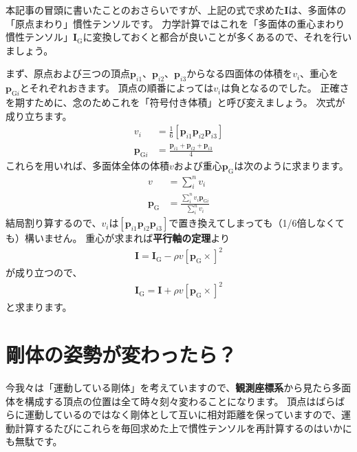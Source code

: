 \documentclass{jsarticle}
\begin{document}
本記事の冒頭に書いたことのおさらいですが、上記の式で求めた$\boldsymbol{I}$は、多面体の「原点まわり」慣性テンソルです。
力学計算ではこれを「多面体の重心まわり慣性テンソル」$\boldsymbol{I}_{\mathrm{G}}$に変換しておくと都合が良いことが多くあるので、それを行いましょう。

まず、原点および三つの頂点$\boldsymbol{p}_{i1}$、$\boldsymbol{p}_{i2}$、$\boldsymbol{p}_{i3}$からなる四面体の体積を$v_{i}$、重心を$\boldsymbol{p}_{\mathrm{G}i}$とそれぞれおきます。
頂点の順番によっては$v_{i}$は負となるのでした。
正確さを期すために、念のためこれを「符号付き体積」と呼び変えましょう。
次式が成り立ちます。
\begin{align*}
v_{i}&=\frac{1}{6}[\boldsymbol{p}_{i1} \boldsymbol{p}_{i2} \boldsymbol{p}_{i3}]
\\
\boldsymbol{p}_{\mathrm{G}i}&=\frac{\displaystyle \boldsymbol{p}_{i1}+\boldsymbol{p}_{i2}+\boldsymbol{p}_{i3}}{4}
\end{align*}
これらを用いれば、多面体全体の体積$v$および重心$\boldsymbol{p}_{\mathrm{G}}$は次のように求まります。
\begin{align*}
v&=\sum_{i}^{n}v_{i}
\\
\boldsymbol{p}_{\mathrm{G}}&=\frac{\displaystyle\sum_{i}^{n}v_{i}\boldsymbol{p}_{\mathrm{G}i}}{\displaystyle\sum_{i}^{n}v_{i}}
\end{align*}
結局割り算するので、$v_{i}$は$[\boldsymbol{p}_{i1} \boldsymbol{p}_{i2} \boldsymbol{p}_{i3}]$で置き換えてしまっても（1/6倍しなくても）構いません。
重心が求まれば{\bf 平行軸の定理}より
\begin{align*}
\boldsymbol{I}=\boldsymbol{I}_{\mathrm{G}}-\rho v\left[\boldsymbol{p}_{\mathrm{G}}\times\right]^{2}
\end{align*}
が成り立つので、
\begin{align*}
\boldsymbol{I}_{\mathrm{G}}=\boldsymbol{I}+\rho v\left[\boldsymbol{p}_{\mathrm{G}}\times\right]^{2}
\end{align*}
と求まります。

\section{剛体の姿勢が変わったら？}

今我々は「運動している剛体」を考えていますので、{\bf 観測座標系}から見たら多面体を構成する頂点の位置は全て時々刻々変わることになります。
頂点はばらばらに運動しているのではなく剛体として互いに相対距離を保っていますので、運動計算するたびにこれらを毎回求めた上で慣性テンソルを再計算するのはいかにも無駄です。
\end{document}

